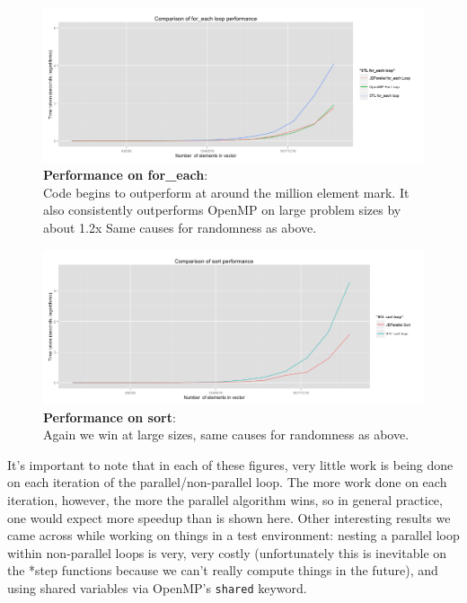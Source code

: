 \documentclass{article}
\begin{document}
     \begin{figure}[h!]
    \centering
\includegraphics[scale = 0.4]{for_each_loop_comparison}
    \caption{\textbf{Performance on for\_each}:\\ Code begins to outperform at around the million element mark. It also consistently outperforms OpenMP on large problem sizes by about 1.2x Same causes for randomness  as above.}
    \end{figure}
     \begin{figure}[h!]
    \centering
\includegraphics[scale = 0.4]{sort_comparison}
    \caption{\textbf{Performance on sort}:\\ Again we win at large sizes, same causes for randomness as above.}
    \end{figure}
 \newpage

It's important to note that in each of these figures, very little work is being done on each iteration of the parallel/non-parallel loop.  The more work done on each iteration, however, the more the parallel algorithm wins, so in general practice, one would expect more speedup than is shown here.  Other interesting results we came across while working on things in a test environment: nesting a parallel loop within non-parallel loops is very, very costly (unfortunately this is inevitable on the *step functions because we can't really compute things in the future), and using shared variables via OpenMP's \texttt{shared} keyword.
\end{document}
